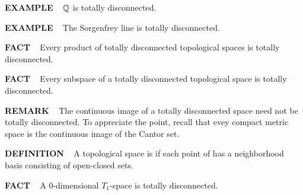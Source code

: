 \vspace{0.1cm}



\begin{x}{\small\bf EXAMPLE} \ %
$\mathbb{Q}$ is totally disconnected. 
\end{x}

\vspace{0.1cm}


\begin{x}{\small\bf EXAMPLE} \ %
The Sorgenfrey line is totally disconnected.
\end{x}

\vspace{0.1cm}


\begin{x}{\small\bf FACT} \ %
Every product of totally disconnected topological spaces is totally disconnected.
\end{x}

\vspace{0.1cm}


\begin{x}{\small\bf FACT} \ %
Every subspace of a totally disconnected topological space is totally disconnected.
\end{x}

\vspace{0.1cm}


\begin{x}{\small\bf REMARK} \ %
The continuous image of a totally disconnected space need not be totally disconnected.  
To appreciate the point, recall that evey compact metric space is the continuous image of the Cantor set.
\end{x}





\begin{x}{\small\bf DEFINITION} \ %
A topological space \mX is 
if each point of \mX has a neighborhood basis consisting of open-closed sets.
\end{x}

\vspace{0.1cm}

\begin{x}{\small\bf FACT} \ %
A 0-dimensional $T_1$-space is totally disconnected.
\end{x}

\vspace{0.1cm}

